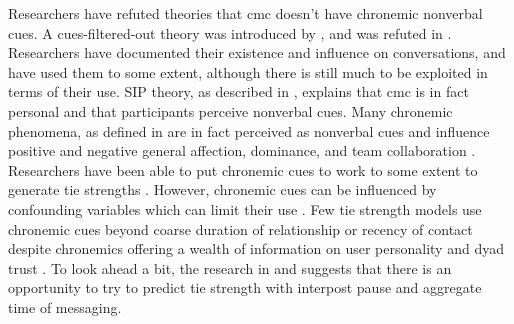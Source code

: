 \documentclass[
  stu]{apa7}
\begin{document}
Researchers have refuted theories that cmc doesn't have chronemic
nonverbal cues. A cues-filtered-out theory was introduced by
\textcite{sproull91}, and was refuted in \textcite{walther95}.
Researchers have documented their existence and influence on
conversations, and have used them to some extent, although there is
still much to be exploited in terms of their use. SIP theory, as
described in \textcite{kim05}, explains that cmc is in fact personal and
that participants perceive nonverbal cues. Many chronemic phenomena, as
defined in \textcite{walther95} are in fact perceived as nonverbal cues
and influence positive and negative general affection, dominance, and
team collaboration \autocite{walther95,doring09,kalman05,kalman11}.
Researchers have been able to put chronemic cues to work to some extent
to generate tie strengths \autocite{arnaboldi13,servia-rodriguez14}.
However, chronemic cues can be influenced by confounding variables which
can limit their use \autocite{marsden84}. Few tie strength models use
chronemic cues beyond coarse duration of relationship or recency of
contact \autocite{liberatore17} despite chronemics offering a wealth of
information on user personality and dyad trust \autocite{kalman13}. To
look ahead a bit, the research in \textcite{liberatore17} and
\textcite{kalman13} suggests that there is an opportunity to try to
predict tie strength with interpost pause and aggregate time of
messaging.

\printbibliography
\end{document}
